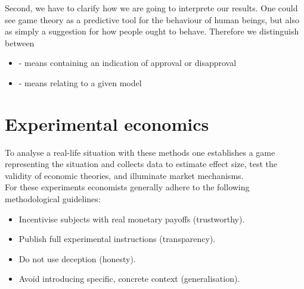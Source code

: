 Second, we have to clarify how we are going to interprete our results. One could see game theory as a predictive tool for the behaviour of human beings, but also as simply a suggestion for how people ought to behave. Therefore we distinguish between
\begin{itemize}
	\item {} - means containing an indication of approval or disapproval
	\item {} - means relating to a given model
\end{itemize}
	

\section{Experimental economics} 
To analyse a real-life situation with these methods one establishes a game representing the situation and collects data to estimate effect size, test the validity of economic theories, and illuminate market mechanisms. \\
For these experiments economists generally adhere to the following methodological guidelines:
	\begin{itemize}
		\item Incentivise subjects with real monetary payoffs (trustworthy).
		\item Publish full experimental instructions (transparency).
		\item Do not use deception (honesty).
		\item Avoid introducing specific, concrete context (generalisation).
	\end{itemize}


\newpage